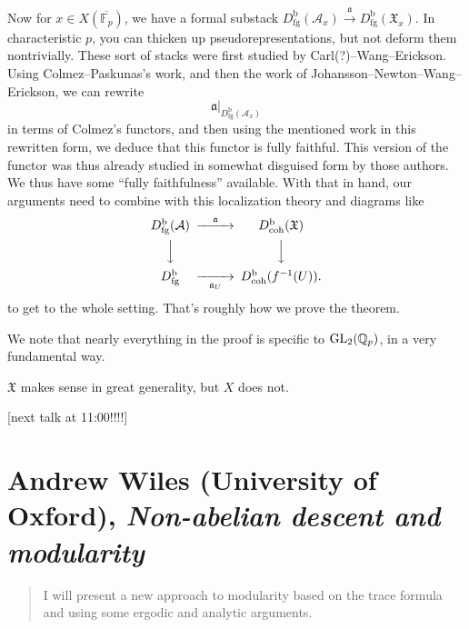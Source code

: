 \documentclass[reqno]{amsart} 
\begin{document}
Now for $x \in X(\overline{\mathbb{F}_p})$, we have a formal substack $D_{\mathrm{fg}}^{\mathrm{b}}(\mathcal{A}_x) \xrightarrow{\mathfrak{a}} D_{\mathrm{fg}}^{\mathrm{b}}(\mathfrak{X}_x )$.  In characteristic $p$, you can thicken up pseudorepresentations, but not deform them nontrivially.  These sort of stacks were first studied by Carl(?)--Wang--Erickson.  Using Colmez--Paskunas's work, and then the work of Johansson--Newton--Wang--Erickson, we can rewrite
\begin{equation*}
  \mathfrak{a} |_{D_{\mathrm{fg}}^{\mathrm{b}}(\mathcal{A}_x)}
\end{equation*}
in terms of Colmez's functors, and then using the mentioned work in this rewritten form, we deduce that this functor is fully faithful.  This version of the functor was thus already studied in somewhat disguised form by those authors.  We thus have some ``fully faithfulness'' available.  With that in hand, our arguments need to combine with this localization theory and diagrams like
\begin{equation*}
  \begin{CD}         
    D^{\mathrm{b}}_{\mathrm{fg}}(\mathcal{A})    @> \mathfrak{a}>> D_{\mathrm{coh}}^{\mathrm{b}}(\mathfrak{X})\\
    @VVV  @VVV \\
    D_{\mathrm{fg}}^{\mathrm{b}} @>> \mathfrak{a}_U> D_{\mathrm{coh}}^{\mathrm{b}}(f^{-1}(U)).\\
  \end{CD}
\end{equation*}
to get to the whole setting.  That's roughly how we prove the theorem.

We note that nearly everything in the proof is specific to $\operatorname{GL}_2(\mathbb{Q}_p)$, in a very fundamental way.

\begin{remark}
  $\mathfrak{X}$ makes sense in great generality, but $X$ does not.
\end{remark}

[next talk at 11:00!!!!]

\part{Andrew Wiles (University of Oxford), \emph{Non-abelian descent and modularity}}

\begin{abstract}
  I will present a new approach to modularity based on the trace formula and using some ergodic
  and analytic arguments.
\end{abstract}
\end{document}
